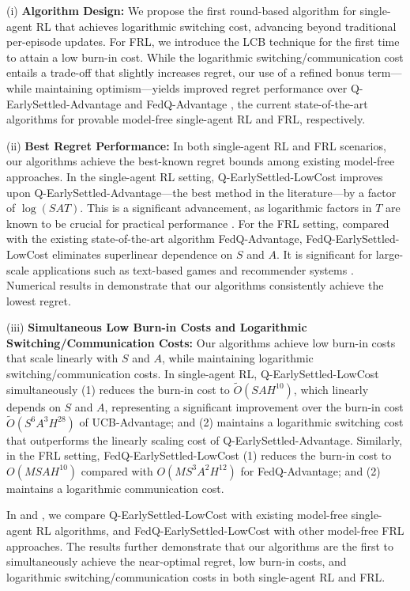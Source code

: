 \documentclass{article}
\begin{document}
(i) \textbf{Algorithm Design:} We propose the first round-based algorithm for single-agent RL that achieves logarithmic switching cost, advancing beyond traditional per-episode updates. For FRL, we introduce the LCB technique for the first time to attain a low burn-in cost. While the logarithmic switching/communication cost entails a trade-off that slightly increases regret, our use of a refined bonus term—while maintaining optimism—yields improved regret performance over Q-EarlySettled-Advantage \cite{li2023breaking} and FedQ-Advantage \cite{zheng2024federated}, the current state-of-the-art algorithms for provable model-free single-agent RL and FRL, respectively.

(ii) \textbf{Best Regret Performance:} In both single-agent RL and FRL scenarios, our algorithms achieve the best-known regret bounds among existing model-free approaches. In the single-agent RL setting, Q-EarlySettled-LowCost improves upon Q-EarlySettled-Advantage---the best method in the literature---by a factor of $\log(SAT)$. This is a significant advancement, as logarithmic factors in $T$ are known to be crucial for practical performance \citep{qiao2022sample, zhang2022horizon}.  For the FRL setting, compared with the existing state-of-the-art algorithm FedQ-Advantage, FedQ-EarlySettled-LowCost eliminates superlinear dependence on $S$ and $A$. It is significant for large-scale applications such as text-based games \cite{bellemare2013arcade} and recommender systems \cite{covington2016deep}. Numerical results in  demonstrate that our algorithms consistently achieve the lowest regret.
    
(iii) \textbf{Simultaneous Low Burn-in Costs and Logarithmic Switching/Communication Costs:} Our algorithms achieve low burn-in costs that scale linearly with $S$ and $A$, while maintaining logarithmic switching/communication costs. In single-agent RL, Q-EarlySettled-LowCost simultaneously (1) reduces the burn-in cost to $\tilde{O}(SAH^{10})$, which linearly depends on $S$ and $A$, representing a significant improvement over the burn-in cost $\tilde{O}(S^6A^3H^{28})$ of UCB-Advantage; and (2) maintains a logarithmic switching cost that outperforms the linearly scaling cost of Q-EarlySettled-Advantage. Similarly, in the FRL setting, FedQ-EarlySettled-LowCost (1) reduces the burn-in cost to $O(MSAH^{10})$ compared with $O(MS^3A^2H^{12})$ for FedQ-Advantage; and (2) maintains a logarithmic communication cost.

In  and , we compare Q-EarlySettled-LowCost with existing model-free single-agent RL algorithms, and FedQ-EarlySettled-LowCost with other model-free FRL approaches. The results further demonstrate that our algorithms are the first to simultaneously achieve the near-optimal regret, low burn-in costs, and logarithmic switching/communication costs in both single-agent RL and FRL.
\end{document}
